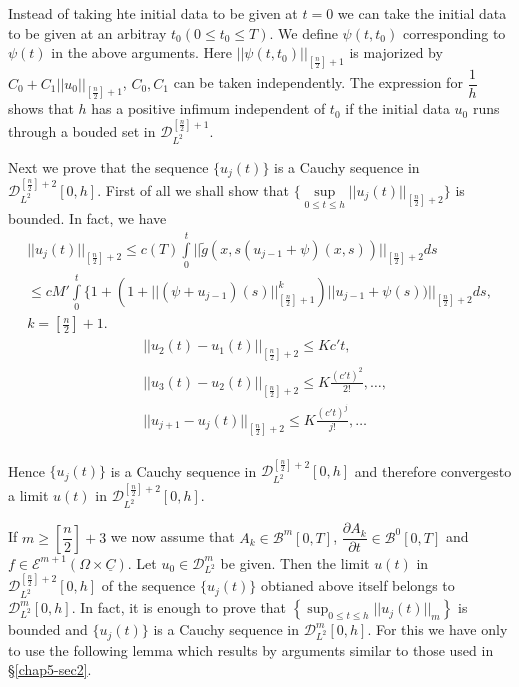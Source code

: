 \begin{remark*}
Instead of taking hte initial data to be given at  $t = 0$ we can take
the initial data to be given at an arbitray $t_0 (0 \leq  t_0 \leq
T)$. We define $\psi (t, t_0)$ corresponding to $\psi (t)$ in the
above arguments. Here $|| \psi (t, t_0)||_{\left[\frac{n}{2}\right] + 1}$ is
majorized by $C_0 + C_1 || u_0 ||_{\left[\frac{n}{2}\right]+1}$, $C_0, C_1$
can be taken independently. The expression for $\dfrac{1}{h}$ shows
that $h$ has a positive infimum independent of $t_0$ if the initial
data $u_0$ runs through a bouded set in
$\mathscr{D}^{\left[\frac{n}{2}\right]+1}_{L^2}$.  
\end{remark*}

Next we prove that the sequence $\{u_j(t) \}$ is a Cauchy sequence in
$\mathscr{D}^{\left[\frac{n}{2} \right]+2}_{L^2}[ 0, h]$. First of all we shall
show that $\{\sup\limits_{0 \leq t \leq h}|| u_j
(t)||_{\left[\frac{n}{2}\right]+2} \}$ is boun\-ded. In fact, we have 
\begin{gather*}
||u_j(t)||_{\left[\frac{n}{2}\right]+2} \leq c(T) \int\limits^t_0 || \tilde{g}
(x, s (u_{j-1} + \psi) (x, s ))||_{\left[\frac{n}{2}\right]+2} ds \\ 
 \leq cM' \int\limits^t_0 \{ 1 +( 1+ || (\psi + u_{j-1}) (s)
 ||^k_{[\frac{n}{2}] + 1}) || u_{j-1} + \psi
 (s))||_{[\frac{n}{2}]+2}ds, \\ 
  k = \left[\frac{n}{2}\right]+1.
 \end{gather*} 
 \begin{align*}
& || u_2 (t) - u_1 (t) ||_{[\frac{n}{2}]+2} \leq K c' t, \\ 
& || u_3 (t) - u_2 (t) ||_{[\frac{n}{2}]+2} \leq K \frac{(c'
     t)^2}{2!}, \ldots,  \\ 
& || u_{j + 1}  - u_j (t) ||_{[\frac{n}{2}]+2} \leq K \frac{(c'
     t)^j}{j!}, \ldots  \\ 
\end{align*} 

Hence $\{u_j (t)\}$ is a Cauchy sequence in
$\mathscr{D}^{[\frac{n}{2}]+2}_{L^2}[0, h]$ and therefore
converges\pageoriginale to 
a limit $u(t)$ in $\mathscr{D}^{[\frac{n}{2}]+2}_{L^2}[0, h]$.  

If $m \geq [\dfrac{n}{2}] + 3 $ we now assume that $A_k \in
\mathscr{B}^m [0, T]$, $\dfrac{\partial A_k}{\partial t} \in
\mathscr{B}^0 [0, T]$ and $f \in \mathscr{E}^{m+1} (\Omega
\times \underline{C})$. Let $u_0 \in \mathscr{D}^m_{L^2}$ be
given. Then the limit $u(t)$ in  $\mathscr{D}^{[\frac{n}{2}] +
  2}_{L^2} [0, h]$ of the sequence $\{ u_j (t) \}$ obtianed above
itself belongs to $\mathscr{D}^m_{L^2}[0, h]$. In fact, it is enough
to prove that $\left\{\sup_{0 \leq t \leq h} || u_j (t)||_m\right\}$ is bounded
and $\{u_j (t)\}$ is a Cauchy sequence in $\mathscr{D}^m_{L^2}[0,
  h]$. For this we have only to use the following lemma which results
by arguments similar to those used in \S \ref{chap5-sec2}.  

